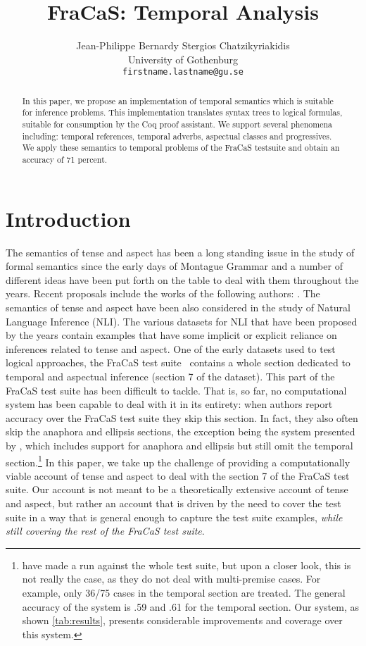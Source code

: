 \documentclass[a4paper,11pt]{article}
\title{FraCaS: Temporal Analysis}
\author{Jean-Philippe Bernardy \qquad Stergios Chatzikyriakidis \\
  University of Gothenburg\\
  {\tt firstname.lastname@gu.se} \\}
\date{}
\begin{document}
\maketitle

\begin{abstract}
  In this paper, we propose an implementation of temporal semantics
  which is suitable for inference problems. This implementation
  translates syntax trees to logical formulas, suitable for
  consumption by the Coq proof assistant. We support several phenomena
  including: temporal references, temporal adverbs, aspectual classes
  and progressives.  We apply these semantics to temporal problems of
  the FraCaS testsuite and obtain an accuracy of 71 percent.
\end{abstract}

\section{Introduction}
\label{sec:introduction}

The semantics of tense and aspect has been a long standing issue in
the study of formal semantics since the early days of Montague Grammar
and a number of different ideas have been put forth on the table to
deal with them throughout the years. Recent proposals include the
works of the following authors:
\citet{dowty:2012,prior:2003,steedman_productions_2000,higginbotham:2009,fernando:2015}.
%
The
semantics of tense and aspect have been also considered in the study of
Natural Language Inference (NLI). The various datasets
for NLI that have been proposed by the years contain examples that
have some implicit or explicit reliance on inferences related to tense
and aspect. One of the early datasets used to test logical approaches,
the FraCaS test suite~\citep{cooper:1996} contains a whole section
dedicated to temporal and aspectual inference (section 7 of the dataset). This part
of the FraCaS test suite has been difficult to tackle. That is,
so far, no computational system has been capable to deal with it in its entirety: when
authors report accuracy over the FraCaS test suite they
skip this section.
%
In fact, they also often skip the anaphora and ellipsis sections, the
exception being the system presented by
\citet{bernardy_type-theoretical_2017,bernardy_wide-coverage_2019},
which includes support for anaphora and ellipsis but still omit the
temporal section.\footnote{\citet{maccartney:2007} have made a run against the whole test suite, but upon a closer look, this is not really the case, as they do not deal with multi-premise cases. For example, only 36/75 cases in the temporal section are treated. The general accuracy of the system is .59 and .61 for the temporal section. Our system, as shown \cref{tab:results}, presents considerable improvements and coverage over this system.}
%
In this paper, we take up the challenge of providing a
computationally viable account of tense and aspect to deal with the
  section 7 of the FraCaS test suite. Our account is not meant
to be a theoretically extensive account of tense and aspect, but rather an
account that is driven by the need to cover the test suite in a way
that is general enough to capture the test suite examples, \emph{while still covering the rest of the FraCaS test suite}.
%
\end{document}
